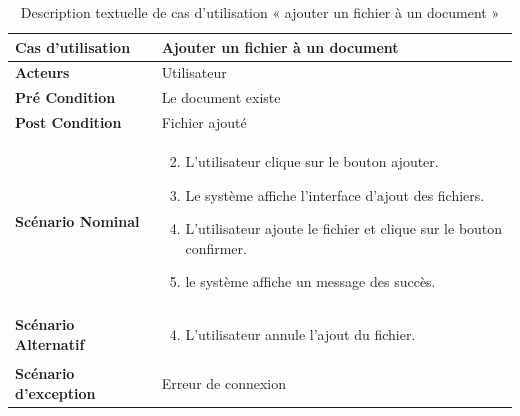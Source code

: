 \begin{longtable}{|p{5cm}|p{10cm}|}
  \caption{Description textuelle de cas d'utilisation « ajouter un fichier à un document »} \label{tab:DescriptionTextuelleDeCasDUtilisationAjouterUnFichierAUnDocument} \\
\hline
\textbf{Cas d'utilisation}&Ajouter un fichier à un document\\
\hline
\textbf{Acteurs}&Utilisateur\\
\hline
\textbf{Pré Condition}&Le document existe\\
\hline
\textbf{Post Condition}&Fichier ajouté\\
\hline
\textbf{Scénario Nominal}&
\vspace{-\baselineskip}
\begin{enumerate}
    \setcounter{enumi}{1}
    \item L'utilisateur clique sur le bouton ajouter.
    \item Le système affiche l'interface d'ajout des fichiers.
    \item L'utilisateur ajoute le fichier et clique sur le bouton confirmer.
    \item le système affiche un message des succès.
    
    
\end{enumerate}\\
\hline
\textbf{Scénario Alternatif}&
\vspace{-\baselineskip}
\begin{enumerate}
    \setcounter{enumi}{3}
    \item L'utilisateur annule l'ajout du fichier.
\end{enumerate}\\
\hline
\textbf{Scénario d'exception}&Erreur de connexion\\
\hline


\end{longtable}


